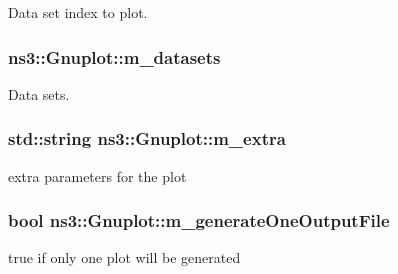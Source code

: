 Data set index to plot. 

\subsubsection[{\texorpdfstring{m\+\_\+datasets}{m_datasets}}]{ ns3\+::\+Gnuplot\+::m\+\_\+datasets\hspace{0.3cm}{\ttfamily [private]}}\hypertarget{classns3_1_1Gnuplot_a67150d03c8735e79efa247e27ffd2ab5}{}\label{classns3_1_1Gnuplot_a67150d03c8735e79efa247e27ffd2ab5}


Data sets. 

\subsubsection[{\texorpdfstring{m\+\_\+extra}{m_extra}}]{\setlength{\rightskip}{0pt plus 5cm}std\+::string ns3\+::\+Gnuplot\+::m\+\_\+extra\hspace{0.3cm}{\ttfamily [private]}}\hypertarget{classns3_1_1Gnuplot_a5b88505b31c6b6aeb22f042f6119ac8b}{}\label{classns3_1_1Gnuplot_a5b88505b31c6b6aeb22f042f6119ac8b}


extra parameters for the plot 

\subsubsection[{\texorpdfstring{m\+\_\+generate\+One\+Output\+File}{m_generateOneOutputFile}}]{\setlength{\rightskip}{0pt plus 5cm}bool ns3\+::\+Gnuplot\+::m\+\_\+generate\+One\+Output\+File\hspace{0.3cm}{\ttfamily [private]}}\hypertarget{classns3_1_1Gnuplot_ad4412600f51935ec7e5d53223f255779}{}\label{classns3_1_1Gnuplot_ad4412600f51935ec7e5d53223f255779}


true if only one plot will be generated 

